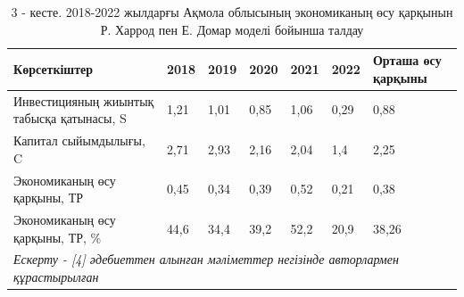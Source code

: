 \begin{table}[H]
\caption*{3 - кесте. 2018-2022 жылдарғы Ақмола облысының экономиканың өсу
қарқынын Р. Харрод пен Е. Домар моделі бойынша талдау}
\centering
\begin{tabular}{|lllllll|}
\hline
\multicolumn{1}{|l|}{Көрсеткіштер} &
  \multicolumn{1}{l|}{2018} &
  \multicolumn{1}{l|}{2019} &
  \multicolumn{1}{l|}{2020} &
  \multicolumn{1}{l|}{2021} &
  \multicolumn{1}{l|}{2022} &
  Орташа өсу қарқыны \\ \hline
\multicolumn{1}{|p{0.25\textwidth}|}{Инвестицияның жиынтық табысқа қатынасы, S} &
  \multicolumn{1}{l|}{1,21} &
  \multicolumn{1}{l|}{1,01} &
  \multicolumn{1}{l|}{0,85} &
  \multicolumn{1}{l|}{1,06} &
  \multicolumn{1}{l|}{0,29} &
  0,88 \\ \hline
\multicolumn{1}{|p{0.25\textwidth}|}{Капитал сыйымдылығы, C} &
  \multicolumn{1}{l|}{2,71} &
  \multicolumn{1}{l|}{2,93} &
  \multicolumn{1}{l|}{2,16} &
  \multicolumn{1}{l|}{2,04} &
  \multicolumn{1}{l|}{1,4} &
  2,25 \\ \hline
\multicolumn{1}{|p{0.25\textwidth}|}{Экономиканың өсу қарқыны, ТР} &
  \multicolumn{1}{l|}{0,45} &
  \multicolumn{1}{l|}{0,34} &
  \multicolumn{1}{l|}{0,39} &
  \multicolumn{1}{l|}{0,52} &
  \multicolumn{1}{l|}{0,21} &
  0,38 \\ \hline
\multicolumn{1}{|p{0.25\textwidth}|}{Экономиканың өсу қарқыны, ТР, \%} &
  \multicolumn{1}{l|}{44,6} &
  \multicolumn{1}{l|}{34,4} &
  \multicolumn{1}{l|}{39,2} &
  \multicolumn{1}{l|}{52,2} &
  \multicolumn{1}{l|}{20,9} &
  38,26 \\ \hline
\multicolumn{7}{|l|}{\textit{Ескерту - {[}4{]} әдебиеттен алынған мәліметтер негізінде авторлармен құрастырылған}} \\ \hline
\end{tabular}
\end{table}

